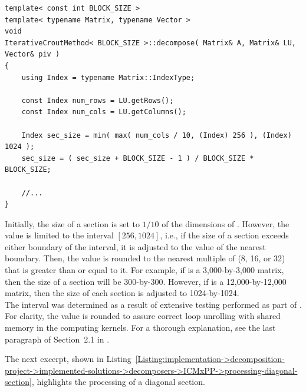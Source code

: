 \begin{lstlisting}[caption={An excerpt from the definition of the overloaded \code{decompose()} method for the ICM\_\textit{x}PP decomposer.
This definition matches the declaration shown in Listing~\ref{Listing:implementation->decomposition-project->implemented-solutions->decomposers->ICMxPP->method-declaration-initial-estimate}.
The \code{Index} type and dimension-representing variables are included for clarity.
The template parameter \code{BLOCK\_SIZE}, equivalent to \textit{x} in ICM\_\textit{x}PP, represents the number of threads in the 1st and 2nd dimensions of a CUDA thread block.},label={Listing:implementation->decomposition-project->implemented-solutions->decomposers->ICMxPP->size-of-sections}]
template< const int BLOCK_SIZE >
template< typename Matrix, typename Vector >
void
IterativeCroutMethod< BLOCK_SIZE >::decompose( Matrix& A, Matrix& LU, Vector& piv )
{
	using Index = typename Matrix::IndexType;
	
	const Index num_rows = LU.getRows();
	const Index num_cols = LU.getColumns();
	
	Index sec_size = min( max( num_cols / 10, (Index) 256 ), (Index) 1024 );
	sec_size = ( sec_size + BLOCK_SIZE - 1 ) / BLOCK_SIZE * BLOCK_SIZE;
	
	//...
}
\end{lstlisting}

Initially, the size of a section is set to $1/10$ of the dimensions of .
However, the value is limited to the interval $\left[256, 1024\right]$, i.e., if the size of a section exceeds either boundary of the interval, it is adjusted to the value of the nearest boundary.
Then, the value is rounded to the nearest multiple of  (8, 16, or 32) that is greater than or equal to it.
For example, if  is a 3,000-by-3,000 matrix, then the size of a section will be 300-by-300.
However, if  is a 12,000-by-12,000 matrix, then the size of each section is adjusted to 1024-by-1024.\\
The interval was determined as a result of extensive testing performed as part of  \cite{Cejka2022}.
For clarity, the value is rounded to assure correct loop unrolling with shared memory in the computing kernels.
For a thorough explanation, see the last paragraph of Section~2.1 in  \cite{Cejka2022}.

The next excerpt, shown in Listing~\ref{Listing:implementation->decomposition-project->implemented-solutions->decomposers->ICMxPP->processing-diagonal-section}, highlights the processing of a diagonal section.

